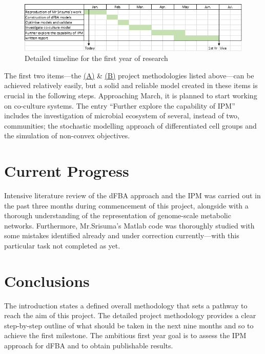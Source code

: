 \documentclass[11pt,a4paper,english]{article}
\begin{document}
\begin{figure}[ht]
    \centering
    \includegraphics[width=\textwidth]{Gantt.png}
    \caption{Detailed timeline for the first year of research}
    \label{fig:my_label2}
\end{figure}

The first two items—the \hyperref[sec:subsecA]{(A)} \& \hyperref[sec:subsecB]{(B)} project methodologies listed above—can be achieved relatively easily, but a solid and reliable model created in these items is crucial in the following steps. Approaching March, it is planned to start working on co-culture systems. The entry “Further explore the capability of IPM” includes the investigation of microbial ecosystem of several, instead of two, communities; the stochastic modelling approach of differentiated cell groups and the simulation of non-convex objectives.

\section*{Current Progress} 
Intensive literature review of the dFBA approach and the IPM was carried out in the past three months during commencement of this project, alongside with a thorough understanding of the representation of genome-scale metabolic networks. Furthermore, Mr.Srisuma’s Matlab code was thoroughly studied with some mistakes identified already and under correction currently—with this particular task not completed as yet. 

\section*{Conclusions}
The introduction states a defined overall methodology that sets a pathway to reach the aim of this project. The detailed project methodology provides a clear step-by-step outline of what should be taken in the next nine months and so to achieve the first milestone. The ambitious first year goal is to assess the IPM approach for dFBA and to obtain publishable results.  


\end{document}
